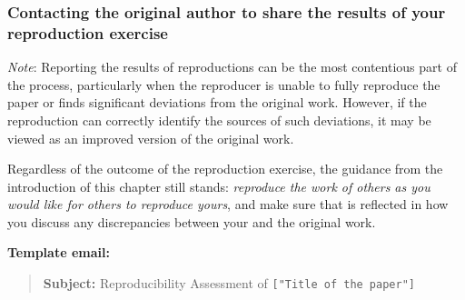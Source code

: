 \subsubsection{Contacting the original author to share the results of your reproduction exercise}

\textit{Note}: Reporting the results of reproductions can be the most
contentious part of the process, particularly when the reproducer is
unable to fully reproduce the paper or finds significant deviations from
the original work. However, if the reproduction can correctly identify
the sources of such deviations, it may be viewed as an improved version
of the original work.

Regardless of the outcome of the reproduction exercise, the guidance
from the introduction of this chapter still stands: \textit{reproduce the
work of others as you would like for others to reproduce yours}, and
make sure that is reflected in how you discuss any discrepancies between
your and the original work.

\textbf{Template email:}

\begin{quote}
\textbf{Subject:} Reproducibility Assessment of
\texttt{{[}"Title\ of\ the\ paper"{]}}
\end{quote}

